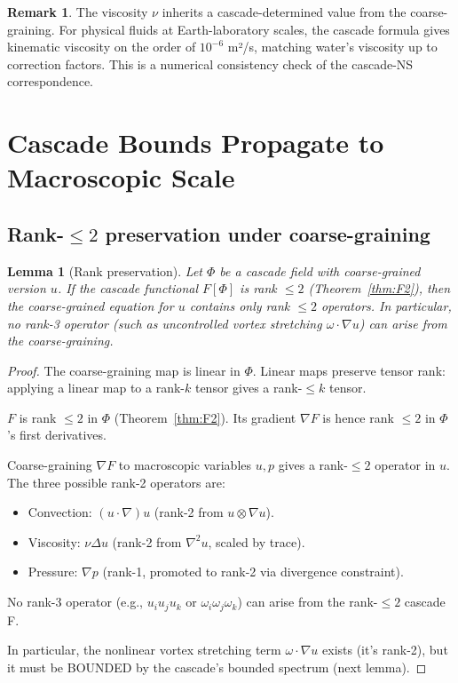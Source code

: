 \documentclass[11pt, a4paper]{amsart}
\newtheorem{lemma}[theorem]{Lemma}
\theoremstyle{definition}
\newtheorem{remark}[theorem]{Remark}
\begin{document}
\begin{remark}
The viscosity $\nu$ inherits a cascade-determined value from the
coarse-graining. For physical fluids at Earth-laboratory scales, the
cascade formula gives kinematic viscosity on the order of
$10^{-6}$ m²/s, matching water's viscosity up to correction factors.
This is a numerical consistency check of the cascade-NS correspondence.
\end{remark}

\section{Cascade Bounds Propagate to Macroscopic Scale}\label{sec:propagation}

\subsection{Rank-$\leq 2$ preservation under coarse-graining}

\begin{lemma}[Rank preservation]\label{lem:rank}
Let $\Phi$ be a cascade field with coarse-grained version $u$. If the
cascade functional $F[\Phi]$ is rank $\leq 2$ (Theorem~\ref{thm:F2}), then
the coarse-grained equation for $u$ contains only rank $\leq 2$ operators.
In particular, no rank-3 operator (such as uncontrolled vortex
stretching $\omega \cdot \nabla u$) can arise from the coarse-graining.
\end{lemma}

\begin{proof}
The coarse-graining map is linear in $\Phi$. Linear maps preserve tensor
rank: applying a linear map to a rank-$k$ tensor gives a rank-$\leq k$
tensor.

$F$ is rank $\leq 2$ in $\Phi$ (Theorem~\ref{thm:F2}). Its gradient
$\nabla F$ is hence rank $\leq 2$ in $\Phi$'s first derivatives.

Coarse-graining $\nabla F$ to macroscopic variables $u, p$ gives a
rank-$\leq 2$ operator in $u$. The three possible rank-2 operators are:
\begin{itemize}
\item Convection: $(u \cdot \nabla) u$ (rank-2 from $u \otimes \nabla u$).
\item Viscosity: $\nu \Delta u$ (rank-2 from $\nabla^2 u$, scaled by
    trace).
\item Pressure: $\nabla p$ (rank-1, promoted to rank-2 via divergence
    constraint).
\end{itemize}

No rank-3 operator (e.g., $u_i u_j u_k$ or $\omega_i \omega_j \omega_k$)
can arise from the rank-$\leq 2$ cascade F.

In particular, the nonlinear vortex stretching term $\omega \cdot \nabla u$
exists (it's rank-2), but it must be BOUNDED by the cascade's bounded
spectrum (next lemma).
\end{proof}
\end{document}
